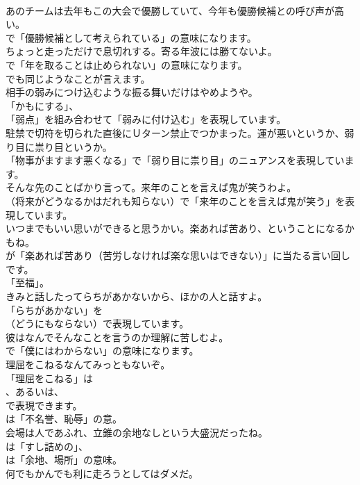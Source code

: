 \documentclass[8pt]{extreport}
\begin{document}
\begin{CJK}{UTF8}{min}
\\	あのチームは去年もこの大会で優勝していて、今年も優勝候補との呼び声が高い。 
\\	で「優勝候補として考えられている」の意味になります。	
\\	ちょっと走っただけで息切れする。寄る年波には勝てないよ。 
\\	で「年を取ることは止められない」の意味になります。
\\	でも同じようなことが言えます。	
\\	相手の弱みにつけ込むような振る舞いだけはやめようや。 
\\	「かもにする」、
\\	「弱点」を組み合わせて「弱みに付け込む」を表現しています。	
\\	駐禁で切符を切られた直後にＵターン禁止でつかまった。運が悪いというか、弱り目に祟り目というか。 
\\	「物事がますます悪くなる」で「弱り目に祟り目」のニュアンスを表現しています。	
\\	そんな先のことばかり言って。来年のことを言えば鬼が笑うわよ。 
\\	（将来がどうなるかはだれも知らない）で「来年のことを言えば鬼が笑う」を表現しています。	
\\	いつまでもいい思いができると思うかい。楽あれば苦あり、ということになるかもね。 
\\	が「楽あれば苦あり（苦労しなければ楽な思いはできない）」に当たる言い回しです。
\\	「至福」。	
\\	きみと話したってらちがあかないから、ほかの人と話すよ。 
\\	「らちがあかない」を 
\\	（どうにもならない）で表現しています。	
\\	彼はなんでそんなことを言うのか理解に苦しむよ。 
\\	で「僕にはわからない」の意味になります。	
\\	理屈をこねるなんてみっともないぞ。 
\\	「理屈をこねる」は 
\\	、あるいは、
\\	で表現できます。
\\	は「不名誉、恥辱」の意。	
\\	会場は人であふれ、立錐の余地なしという大盛況だったね。 
\\	は「すし詰めの」、
\\	は「余地、場所」の意味。	
\\	何でもかんでも利に走ろうとしてはダメだ。 

\end{CJK}
\end{document}
